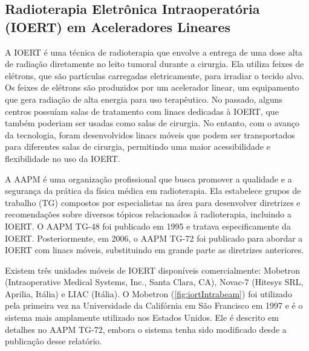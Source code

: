 \documentclass[11pt,a4paper]{article}
\begin{document}
\subsection*{Radioterapia Eletrônica Intraoperatória (IOERT) em Aceleradores Lineares}

	A IOERT é uma técnica de radioterapia que envolve a entrega de uma dose alta de radiação diretamente no leito tumoral durante a cirurgia. Ela utiliza feixes de elétrons, que são partículas carregadas eletricamente, para irradiar o tecido alvo. Os feixes de elétrons são produzidos por um acelerador linear, um equipamento que gera radiação de alta energia para uso terapêutico. No passado, alguns centros possuíam salas de tratamento com linacs dedicadas à IOERT, que também poderiam ser usadas como salas de cirurgia. No entanto, com o avanço da tecnologia, foram desenvolvidos linacs móveis que podem ser transportados para diferentes salas de cirurgia, permitindo uma maior acessibilidade e flexibilidade no uso da IOERT.

	A AAPM é uma organização profissional que busca promover a qualidade e a segurança da prática da física médica em radioterapia. Ela estabelece grupos de trabalho (TG) compostos por especialistas na área para desenvolver diretrizes e recomendações sobre diversos tópicos relacionados à radioterapia, incluindo a IOERT. O AAPM TG-48 foi publicado em 1995 e tratava especificamente da IOERT. Posteriormente, em 2006, o AAPM TG-72 foi publicado para abordar a IOERT com linacs móveis, substituindo em grande parte as diretrizes anteriores.

	Existem três unidades móveis de IOERT disponíveis comercialmente: Mobetron (Intraoperative Medical Systems, Inc., Santa Clara, CA), Novac-7 (Hitesys SRL, Aprilia, Itália) e LIAC (Itália). O Mobetron (\ref{fig:iortIntrabeam}) foi utilizado pela primeira vez na Universidade da Califórnia em São Francisco em 1997 e é o sistema mais amplamente utilizado nos Estados Unidos. Ele é descrito em detalhes no AAPM TG-72, embora o sistema tenha sido modificado desde a publicação desse relatório. 
\end{document}
